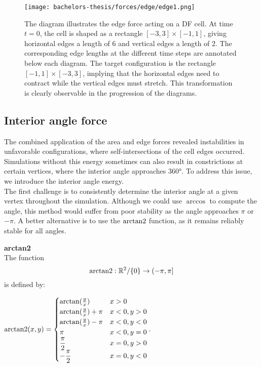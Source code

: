 \begin{figure}
	\begin{center}
		\texttt{[image: bachelors-thesis/forces/edge/edge1.png]}
		\caption{The diagram illustrates the edge force acting on a DF cell.
		At time $t=0$, the cell is shaped as a rectangle $[-3,3]\times [-1,1]$, giving horizontal edges a length of 6 and vertical edges a length of 2.
		The corresponding edge lengths at the different time steps are annotated below each diagram.
		The target configuration is the rectangle $[-1,1]\times [-3,3]$, implying that the horizontal edges need to contract while the vertical edges must stretch.
		This transformation is clearly observable in the progression of the diagrams.
		}
		\label{fig:edgeForce}
	\end{center}
\end{figure}





\subsection{Interior angle force}
The combined application of the area and edge forces revealed instabilities in unfavorable configurations, where self-intersections of the cell edges occurred. 
Simulations without this energy sometimes can also result in constrictions at certain vertices, where the interior angle approaches $360°$. 
To address this issue, we introduce the interior angle energy. \\
The first challenge is to consistently determine the interior angle at a given vertex throughout the simulation.
Although we could use $\arccos$ to compute the angle, this method would suffer from poor stability as the angle approaches $\pi$ or $-\pi$.
A better alternative is to use the $\operatorname{arctan2}$ function, as it remains reliably stable for all angles. \\

\begin{definition} \textbf{arctan2} \\
	The function $$\operatorname{arctan2}:\mathbb{R}^2/\{0\} \rightarrow (-\pi, \pi]$$ is defined by:
	\begin{center}
		$ \operatorname{arctan2}(x,y) = 
		\begin{cases}
			\arctan(\frac{y}{x}) & x > 0 \\
			\arctan(\frac{y}{x}) + \pi & x < 0, y > 0 \\
			\arctan(\frac{y}{x}) - \pi & x < 0, y < 0 \\
			\pi & x < 0, y = 0 \\
			\dfrac{\pi}{2} & x = 0, y > 0 \\ 		
			- \dfrac{\pi}{2} & x = 0, y < 0 \\ 
		\end{cases}. $
	\end{center}
\end{definition}

